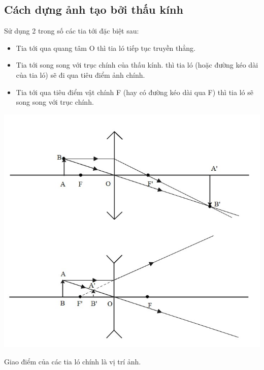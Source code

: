\subsection{Cách dựng ảnh tạo bởi thấu kính}
Sử dụng 2 trong số các tia tới đặc biệt sau:
\begin{itemize}
	\item Tia tới qua quang tâm O thì tia ló tiếp tục truyền thẳng.
	\item Tia tới song song với trục chính của thấu kính. thì tia ló (hoặc đường kéo dài của tia ló) sẽ đi qua tiêu điểm ảnh chính.
	\item Tia tới qua tiêu điểm vật chính F (hay có đường kéo dài qua F) thì tia ló sẽ song song với trục chính.
\end{itemize}
\begin{center}
	\includegraphics[scale=0.7]{../figs/VN11-PH-38-L-026-2-h25.jpg}
\end{center}
 Giao điểm của các tia ló chính là vị trí ảnh. 

